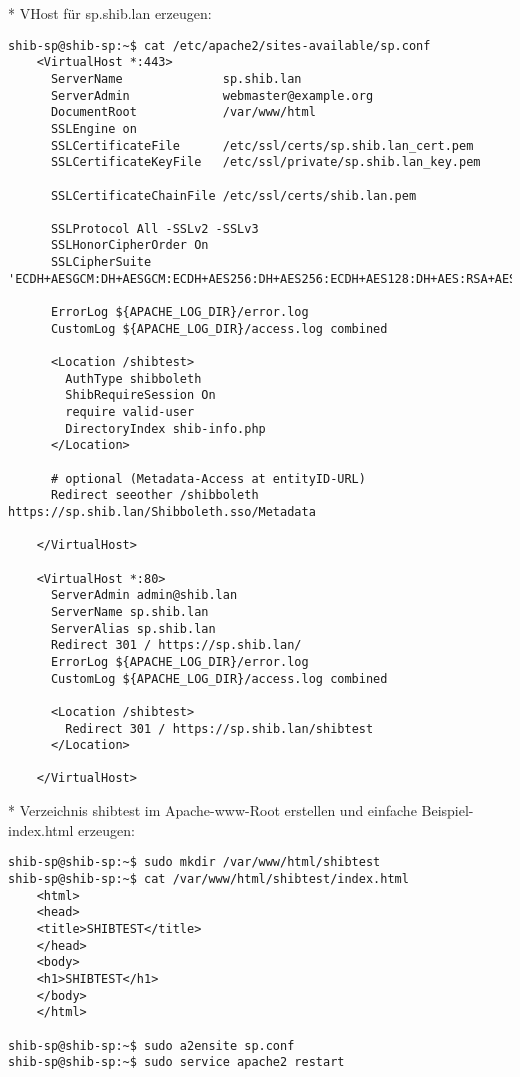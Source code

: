 * VHost für sp.shib.lan erzeugen:
\begin{lstlisting}
shib-sp@shib-sp:~$ cat /etc/apache2/sites-available/sp.conf 
	<VirtualHost *:443>
	  ServerName              sp.shib.lan
	  ServerAdmin             webmaster@example.org
	  DocumentRoot            /var/www/html
	  SSLEngine on
	  SSLCertificateFile      /etc/ssl/certs/sp.shib.lan_cert.pem
	  SSLCertificateKeyFile   /etc/ssl/private/sp.shib.lan_key.pem
	 
	  SSLCertificateChainFile /etc/ssl/certs/shib.lan.pem
	 
	  SSLProtocol All -SSLv2 -SSLv3
	  SSLHonorCipherOrder On
	  SSLCipherSuite 'ECDH+AESGCM:DH+AESGCM:ECDH+AES256:DH+AES256:ECDH+AES128:DH+AES:RSA+AESGCM:RSA+AES:ECDH+3DES:DH+3DES:RSA+3DES:!aNULL:!eNULL:!LOW:!RC4:!MD5:!EXP:!PSK:!DSS:!SEED:!ECDSA:!CAMELLIA'

	  ErrorLog ${APACHE_LOG_DIR}/error.log
	  CustomLog ${APACHE_LOG_DIR}/access.log combined

	  <Location /shibtest>
		AuthType shibboleth
		ShibRequireSession On
		require valid-user
		DirectoryIndex shib-info.php
	  </Location>
	  
	  # optional (Metadata-Access at entityID-URL)
	  Redirect seeother /shibboleth https://sp.shib.lan/Shibboleth.sso/Metadata
	 
	</VirtualHost>

	<VirtualHost *:80>
	  ServerAdmin admin@shib.lan
	  ServerName sp.shib.lan
	  ServerAlias sp.shib.lan 
	  Redirect 301 / https://sp.shib.lan/
	  ErrorLog ${APACHE_LOG_DIR}/error.log
	  CustomLog ${APACHE_LOG_DIR}/access.log combined

	  <Location /shibtest>
		Redirect 301 / https://sp.shib.lan/shibtest
	  </Location>

	</VirtualHost>
\end{lstlisting}
* Verzeichnis shibtest im Apache-www-Root erstellen und einfache
Beispiel-index.html erzeugen:
\begin{lstlisting}
shib-sp@shib-sp:~$ sudo mkdir /var/www/html/shibtest
shib-sp@shib-sp:~$ cat /var/www/html/shibtest/index.html 
	<html>
	<head>
	<title>SHIBTEST</title>
	</head>
	<body>
	<h1>SHIBTEST</h1>
	</body>
	</html>
			
shib-sp@shib-sp:~$ sudo a2ensite sp.conf
shib-sp@shib-sp:~$ sudo service apache2 restart
\end{lstlisting}


